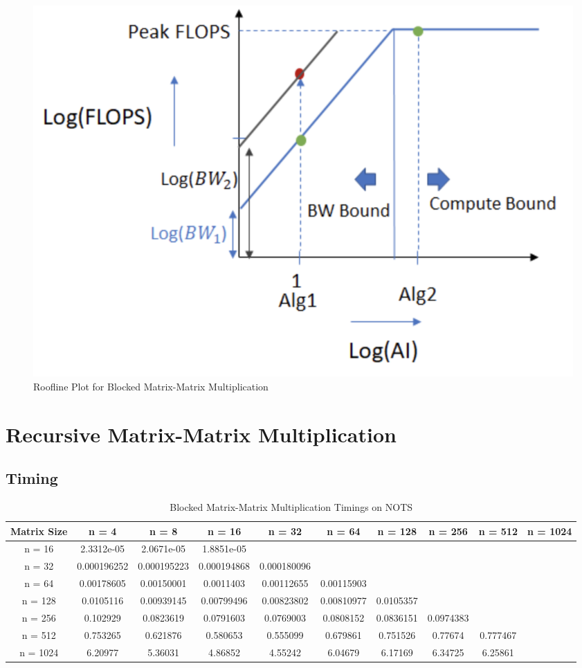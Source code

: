 \documentclass{article}
\begin{document}
\begin{figure}[!htb]
    \centering
    \includegraphics[width=0.8\linewidth]{roofline_plot.png}
    \caption{Roofline Plot for Blocked Matrix-Matrix Multiplication}
\end{figure}


\section{Recursive Matrix-Matrix Multiplication}

\subsection{Timing}

\begin{table}[ht!]
    \caption{Blocked Matrix-Matrix Multiplication Timings on NOTS}
    \centering
    \begin{tabular}{|c|c|c|c|c|c|c|c|c|c|}
        \hline
        Matrix Size & n = 4 & n = 8 & n = 16 & n = 32 & n = 64 & n = 128 & n = 256 & n = 512 & n = 1024 \\
        \hline
        n = 16 & 2.3312e-05 & 2.0671e-05 & 1.8851e-05 \\
        \hline
        n = 32 & 0.000196252 & 0.000195223 & 0.000194868 & 0.000180096 \\
        \hline
        n = 64 & 0.00178605 & 0.00150001 & 0.0011403 & 0.00112655 & 0.00115903 \\
        \hline
        n = 128 & 0.0105116 & 0.00939145 & 0.00799496 & 0.00823802 & 0.00810977 & 0.0105357 \\
        \hline
        n = 256 & 0.102929 & 0.0823619 & 0.0791603 & 0.0769003 & 0.0808152 & 0.0836151 & 0.0974383 \\
        \hline
        n = 512 & 0.753265 & 0.621876 & 0.580653 & 0.555099 & 0.679861 & 0.751526 & 0.77674 & 0.777467 \\
        \hline 
        n = 1024 & 6.20977 & 5.36031 & 4.86852 & 4.55242 & 6.04679 & 6.17169 & 6.34725 & 6.25861 \\
        \hline
    \end{tabular}
\end{table}
\end{document}
